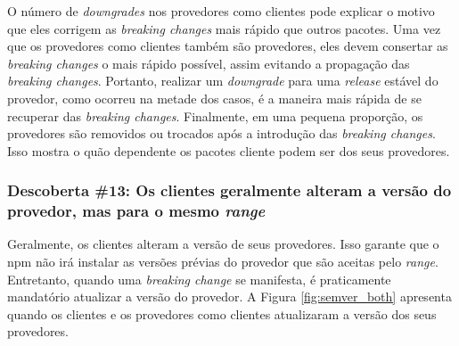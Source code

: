O número de \textit{downgrades} nos provedores como clientes pode explicar o motivo que eles corrigem as \textit{breaking changes} mais rápido que outros pacotes. Uma vez que os provedores como clientes também são provedores, eles devem consertar as \textit{breaking changes} o mais rápido possível, assim evitando a propagação das \textit{breaking changes}. Portanto, realizar um \textit{downgrade} para uma \textit{release} estável do provedor, como ocorreu na metade dos casos, é a maneira mais rápida de se recuperar das \textit{breaking changes}. Finalmente, em uma pequena proporção, os provedores são removidos ou trocados após a introdução das \textit{breaking changes}. Isso mostra o quão dependente os pacotes cliente podem ser dos seus provedores.

\subsubsection{Descoberta \#13: Os clientes geralmente alteram a versão do provedor, mas para o mesmo \textit{range}}

Geralmente, os clientes alteram a versão de seus provedores. Isso garante que o \textsf{npm} não irá instalar as versões prévias do provedor que são aceitas pelo \textit{range}. Entretanto, quando uma \textit{breaking change} se manifesta, é praticamente mandatório atualizar a versão do provedor. A Figura \ref{fig:semver_both} apresenta quando os clientes e os provedores como clientes atualizaram a versão dos seus provedores.

